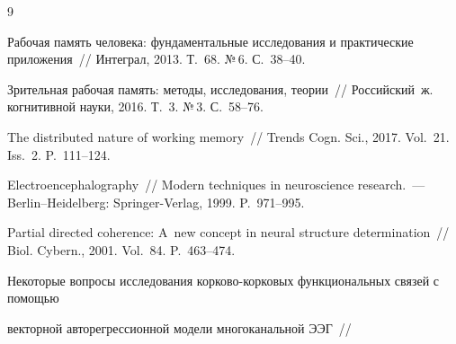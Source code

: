 {\small\frenchspacing


{%




\begin{thebibliography}{9}









Рабочая память человека: фундаментальные исследования и практические приложения~/\!\!/ Интеграл, 2013. Т.~68. №\,6. С.~38--40.









Зрительная рабочая память: методы, исследования, теории~/\!\!/ Российский~ж. когнитивной науки, 2016. Т.~3. №\,3. С.~58--76.












The distributed nature of working memory~/\!\!/ Trends  Cogn. Sci., 2017. Vol.~21. Iss.~2. P.~111--124.









Electroencephalography~/\!\!/ Modern techniques in neuroscience research.~--- Berlin--Heidelberg: Springer-Verlag, 1999. P.~971--995.






Partial directed coherence: A~new concept in neural structure determination~/\!\!/ Biol. Cybern., 2001. Vol.~84. P.~463--474.






Некоторые вопросы исследования кор\-ко\-во-кор\-ко\-вых функциональных связей с помощью 


векторной авторегрессионной модели многоканальной ЭЭГ~/\!\!/ 



\end{thebibliography}}}
